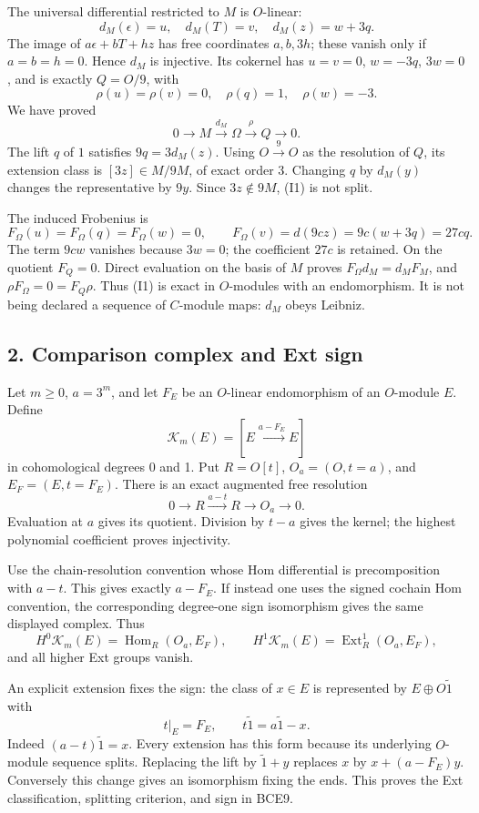 \documentclass[
  10pt,
]{article}
\begin{document}
The universal differential restricted to \(M\) is \(O\)-linear: \[
d_M(\epsilon)=u,\quad d_M(T)=v,\quad d_M(z)=w+3q.
\] The image of \(a\epsilon+bT+hz\) has free coordinates \(a,b,3h\);
these vanish only if \(a=b=h=0\). Hence \(d_M\) is injective. Its
cokernel has \(u=v=0\), \(w=-3q\), \(3w=0\), and is exactly \(Q=O/9\),
with \[
\rho(u)=\rho(v)=0,\quad\rho(q)=1,\quad\rho(w)=-3.
\] We have proved \[
0\longrightarrow M\xrightarrow{d_M}\Omega
\xrightarrow{\rho}Q\longrightarrow0. \tag{I1}
\] The lift \(q\) of \(1\) satisfies \(9q=3d_M(z)\). Using
\(O\xrightarrow9O\) as the resolution of \(Q\), its extension class is
\([3z]\in M/9M\), of exact order 3. Changing \(q\) by \(d_M(y)\) changes
the representative by \(9y\). Since \(3z\notin9M\), (I1) is not split.

The induced Frobenius is \[
F_\Omega(u)=F_\Omega(q)=F_\Omega(w)=0,\qquad
F_\Omega(v)=d(9cz)=9c(w+3q)=27cq.
\] The term \(9cw\) vanishes because \(3w=0\); the coefficient \(27c\)
is retained. On the quotient \(F_Q=0\). Direct evaluation on the basis
of \(M\) proves \(F_\Omega d_M=d_MF_M\), and
\(\rho F_\Omega=0=F_Q\rho\). Thus (I1) is exact in \(O\)-modules with an
endomorphism. It is not being declared a sequence of \(C\)-module maps:
\(d_M\) obeys Leibniz.

\subsection{2. Comparison complex and Ext
sign}\label{comparison-complex-and-ext-sign}

Let \(m\ge0\), \(a=3^m\), and let \(F_E\) be an \(O\)-linear
endomorphism of an \(O\)-module \(E\). Define \[
\mathcal K_m(E)=[E\xrightarrow{a-F_E}E]
\] in cohomological degrees 0 and 1. Put \(R=O[t]\), \(O_a=(O,t=a)\),
and \(E_F=(E,t=F_E)\). There is an exact augmented free resolution \[
0\longrightarrow R\xrightarrow{a-t}R
\longrightarrow O_a\longrightarrow0. \tag{I2}
\] Evaluation at \(a\) gives its quotient. Division by \(t-a\) gives the
kernel; the highest polynomial coefficient proves injectivity.

Use the chain-resolution convention whose Hom differential is
precomposition with \(a-t\). This gives exactly \(a-F_E\). If instead
one uses the signed cochain Hom convention, the corresponding degree-one
sign isomorphism gives the same displayed complex. Thus \[
H^0\mathcal K_m(E)=\operatorname{Hom}_R(O_a,E_F),\qquad
H^1\mathcal K_m(E)=\operatorname{Ext}^1_R(O_a,E_F),
\] and all higher Ext groups vanish.

An explicit extension fixes the sign: the class of \(x\in E\) is
represented by \(E\oplus O\widetilde1\) with \[
t|_E=F_E,\qquad t\widetilde1=a\widetilde1-x. \tag{I3}
\] Indeed \((a-t)\widetilde1=x\). Every extension has this form because
its underlying \(O\)-module sequence splits. Replacing the lift by
\(\widetilde1+y\) replaces \(x\) by \(x+(a-F_E)y\). Conversely this
change gives an isomorphism fixing the ends. This proves the Ext
classification, splitting criterion, and sign in BCE9.
\end{document}
